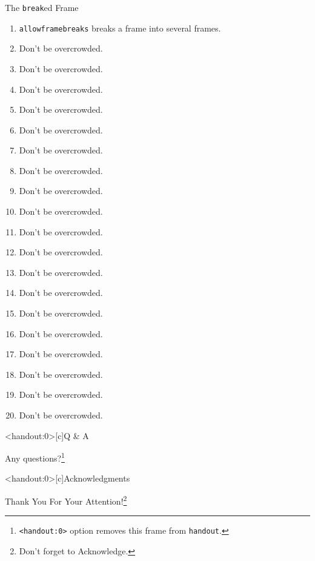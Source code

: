 \documentclass[
        handout,
        ]{beamer}
\begin{document}
\begin{frame}[allowframebreaks]{The \texttt{break}ed Frame} %
    \begin{enumerate}
    \item \texttt{allowframebreaks} breaks a frame into several frames.
    \item Don't be overcrowded.
    \item Don't be overcrowded.
    \item Don't be overcrowded.
    \item Don't be overcrowded.

    \item Don't be overcrowded.
    \item Don't be overcrowded.
    \item Don't be overcrowded.
    \item Don't be overcrowded.
    \item Don't be overcrowded.
    
    \item Don't be overcrowded.
    \item Don't be overcrowded.
    \item Don't be overcrowded.
    \item Don't be overcrowded.
    \item Don't be overcrowded.
    
    \item Don't be overcrowded.
    \item Don't be overcrowded.
    \item Don't be overcrowded.
    \item Don't be overcrowded.
    \item Don't be overcrowded.
    \end{enumerate}
\end{frame}


\begin{frame}<handout:0>[c]{Q \& A}
    \centerline{\LARGE{Any questions?\footnote{\texttt{<handout:0>} option removes this frame from \texttt{handout}.}}}    
\end{frame}    
    
\begin{frame}<handout:0>[c]{Acknowledgments}
    \centerline{\LARGE{Thank You For Your Attention!\footnote{Don't forget to Acknowledge.}}} 
\end{frame}
    
    
\end{document}
